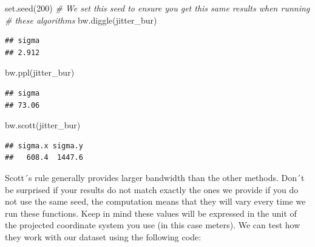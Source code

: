 \documentclass[
  krantz2]{krantz}
\makeatletter
\newenvironment{Shaded}{\begin{snugshade}}{\end{snugshade}}
\newcommand{\CommentTok}[1]{\textcolor[rgb]{0.37,0.37,0.37}{\textit{#1}}}
\newcommand{\DecValTok}[1]{\textcolor[rgb]{0.06,0.06,0.06}{#1}}
\newcommand{\FunctionTok}[1]{\textcolor[rgb]{0,0,0}{#1}}
\newcommand{\NormalTok}[1]{#1}
\newenvironment{kframe}{%
\medskip{}
\setlength{\fboxsep}{.8em}
 \def\at@end@of@kframe{}%
 \ifinner\ifhmode%
  \def\at@end@of@kframe{\end{minipage}}%
  \begin{minipage}{\columnwidth}%
 \fi\fi%
 \def\FrameCommand##1{\hskip\@totalleftmargin \hskip-\fboxsep
 \colorbox{shadecolor}{##1}\hskip-\fboxsep
     \hskip-\linewidth \hskip-\@totalleftmargin \hskip\columnwidth}%
 \MakeFramed {\advance\hsize-\width
   \@totalleftmargin\z@ \linewidth\hsize
   \@setminipage}}%
 {\par\unskip\endMakeFramed%
 \at@end@of@kframe}
\renewenvironment{Shaded}{\begin{kframe}}{\end{kframe}}
\makeatother
\begin{document}
\begin{Shaded}
\begin{Highlighting}[]
\FunctionTok{set.seed}\NormalTok{(}\DecValTok{200}\NormalTok{) }\CommentTok{\# We set this seed to ensure you get this same results when running}
              \CommentTok{\# these algorithms}
\FunctionTok{bw.diggle}\NormalTok{(jitter\_bur)}
\end{Highlighting}
\end{Shaded}

\begin{verbatim}
## sigma 
## 2.912
\end{verbatim}

\begin{Shaded}
\begin{Highlighting}[]
\FunctionTok{bw.ppl}\NormalTok{(jitter\_bur)}
\end{Highlighting}
\end{Shaded}

\begin{verbatim}
## sigma 
## 73.06
\end{verbatim}

\begin{Shaded}
\begin{Highlighting}[]
\FunctionTok{bw.scott}\NormalTok{(jitter\_bur)}
\end{Highlighting}
\end{Shaded}

\begin{verbatim}
## sigma.x sigma.y 
##   608.4  1447.6
\end{verbatim}

Scott´s rule generally provides larger bandwidth than the other methods. Don´t be surprised if your results do not match exactly the ones we provide if you do not use the same seed, the computation means that they will vary every time we run these functions. Keep in mind these values will be expressed in the unit of the projected coordinate system you use (in this case meters). We can test how they work with our dataset using the following code:
\end{document}
